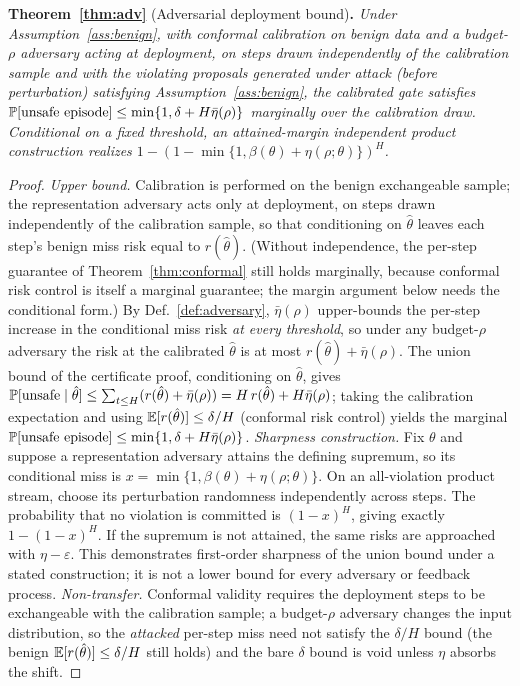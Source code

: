\medskip
\noindent\textbf{Theorem~\ref{thm:adv}} (Adversarial deployment bound)\textbf{.}
\emph{Under Assumption~\ref{ass:benign}, with conformal calibration on benign
data and a budget-$\rho$ adversary acting at deployment, on steps drawn independently of
the calibration sample and with the violating proposals generated under attack (before
perturbation) satisfying Assumption~\ref{ass:benign}, the calibrated gate satisfies
$\mathbb{P}[\text{unsafe episode}]\le\min\{1,\delta+H\bar\eta(\rho)\}$ marginally over the calibration draw. Conditional on a fixed
threshold, an attained-margin independent product construction realizes
$1-(1-\min\{1,\beta(\theta)+\eta(\rho;\theta)\})^H$.}

\begin{proof}
\emph{Upper bound.} Calibration is performed on the benign exchangeable sample;
the representation adversary acts only at deployment, on steps drawn independently
of the calibration sample, so that conditioning on $\hat\theta$ leaves each step's
benign miss risk equal to $r(\hat\theta)$. (Without independence, the per-step
guarantee of Theorem~\ref{thm:conformal} still holds marginally, because conformal risk control is itself a marginal
guarantee; the margin argument below needs the conditional form.) By
Def.~\ref{def:adversary}, $\bar\eta(\rho)$ upper-bounds the
per-step increase in the conditional miss risk \emph{at every threshold}, so under any
budget-$\rho$ adversary the risk at the calibrated $\hat\theta$ is at most
$r(\hat\theta)+\bar\eta(\rho)$. The union bound of the certificate proof, conditioning on
$\hat\theta$, gives $\mathbb{P}[\text{unsafe}\mid\hat\theta]\le\sum_{t\le H}(r(\hat\theta)+\bar\eta(\rho))
=H\,r(\hat\theta)+H\bar\eta(\rho)$; taking the calibration expectation and using
$\mathbb{E}[r(\hat\theta)]\le\delta/H$ (conformal risk control) yields the marginal
$\mathbb{P}[\text{unsafe episode}]\le\min\{1,\delta+H\bar\eta(\rho)\}$.
\emph{Sharpness construction.} Fix $\theta$ and suppose a representation adversary
attains the defining supremum, so its conditional miss is
$x=\min\{1,\beta(\theta)+\eta(\rho;\theta)\}$. On an all-violation product stream,
choose its perturbation randomness independently across steps. The probability
that no violation is committed is $(1-x)^H$, giving exactly
$1-(1-x)^H$. If the supremum is not attained, the same risks are approached with
$\eta-\varepsilon$. This demonstrates first-order sharpness of the union bound
under a stated construction; it is not a lower bound for every adversary or
feedback process.
\emph{Non-transfer.} Conformal validity requires the deployment steps to be
exchangeable with the calibration sample; a budget-$\rho$ adversary changes the
input distribution, so the \emph{attacked} per-step miss need not satisfy the $\delta/H$
bound (the benign $\mathbb{E}[r(\hat\theta)]\le\delta/H$ still holds) and the bare
$\delta$ bound is void unless $\eta$ absorbs the shift.
\end{proof}

